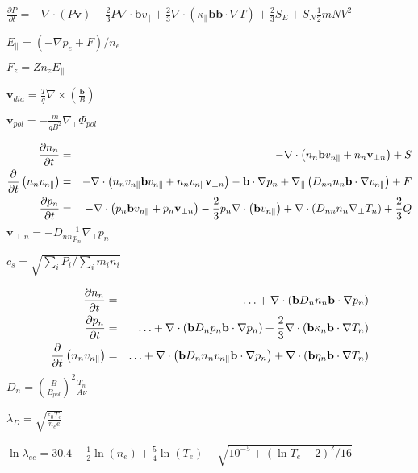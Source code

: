 $\frac{\partial P}{\partial t} = -\nabla\cdot\left(P\mathbf{v}\right) - 
\frac{2}{3} P \nabla\cdot\mathbf{b}v_{\|} + 
\frac{2}{3}\nabla\cdot\left(\kappa_{\|}\mathbf{b}\mathbf{b}\cdot\nabla T\right) 
+ \frac{2}{3}S_E + S_N\frac{1}{2}mNV^2$

$E_{\|} = \left(-\nabla p_e + F\right) / n_e$

$F_z = Z n_z E_{\|}$

$\mathbf{v}_{dia} = \frac{T}{q} \nabla\times\left(\frac{\mathbf{b}}{B}\right)$

$\mathbf{v}_{pol} = - \frac{m}{q B^2} \nabla_\perp\Phi_{pol}$

\begin{eqnarray}
\frac{\partial n_n}{\partial t} &=& -\nabla\cdot\left(n_n\mathbf{b}v_{n\|} + 
n_n\mathbf{v}_{\perp n}\right) + S\\ \frac{\partial}{\partial 
t}\left(n_nv_{n\|}\right) &=& -\nabla\cdot\left(n_nv_{n\|} \mathbf{b}v_{n\|} + 
n_nv_{n\|}\mathbf{v}_{\perp n}\right) - {\bf b}\cdot{\nabla}p_n + 
\nabla_{\|}\left(D_{nn}n_n{\bf b}\cdot{\nabla}v_{n\|}\right) + F \\ \frac{\partial 
p_n}{\partial t} &=& -\nabla\cdot\left(p_n\mathbf{b}v_{n\|} + 
p_n\mathbf{v}_{\perp n}\right) - 
\frac{2}{3}p_n\nabla\cdot\left(\mathbf{b}v_{n\|}\right) + 
\nabla\cdot\left(D_{nn}n_n\nabla_\perp T_n\right) + \frac{2}{3}Q \end{eqnarray}
$\mathbf{v}_{\perp n} = -D_{nn}\frac{1}{p_n}\nabla_\perp p_n$

$c_s = \sqrt{\sum_i P_i / \sum_i m_in_i}$

\begin{eqnarray}
 \frac{\partial n_n}{\partial t} &=& \ldots + \nabla\cdot\left(\mathbf{b}D_n 
n_n{\bf b}\cdot{\nabla}p_n\right) \\ \frac{\partial p_n}{\partial t} &=& \ldots + 
\nabla\cdot\left(\mathbf{b}D_n p_n{\bf b}\cdot{\nabla}p_n\right) + 
\frac{2}{3}\nabla\cdot\left(\mathbf{b}\kappa_n {\bf b}\cdot{\nabla}T_n\right) \\ 
\frac{\partial}{\partial t}\left(n_nv_{n\|}\right) &=& \ldots + 
\nabla\cdot\left(\mathbf{b}D_n n_nv_{n\|} {\bf b}\cdot{\nabla}p_n\right) + 
\nabla\cdot\left(\mathbf{b}\eta_n {\bf b}\cdot{\nabla}T_n\right) \end{eqnarray}
$D_n = \left(\frac{B}{B_{pol}}\right)^2 \frac{T_n}{A \nu}$

$\lambda_D = \sqrt{\frac{\epsilon_0 T_e}{n_e e}}$

$\ln \lambda_{ee} = 30.4 - \frac{1}{2} \ln\left(n_e\right) + 
\frac{5}{4}\ln\left(T_e\right) - \sqrt{10^{-5} + \left(\ln T_e - 2\right)^2 / 
16}$

